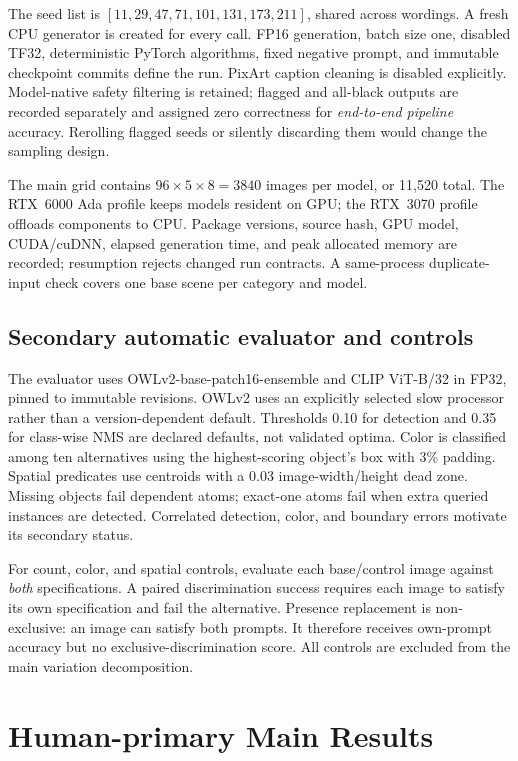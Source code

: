 \documentclass[10pt,letterpaper]{article}
\begin{document}
The seed list is $[11,29,47,71,101,131,173,211]$, shared across wordings. A fresh CPU generator is created for every call. FP16 generation, batch size one, disabled TF32, deterministic PyTorch algorithms, fixed negative prompt, and immutable checkpoint commits define the run. PixArt caption cleaning is disabled explicitly. Model-native safety filtering is retained; flagged and all-black outputs are recorded separately and assigned zero correctness for \emph{end-to-end pipeline} accuracy. Rerolling flagged seeds or silently discarding them would change the sampling design.

The main grid contains $96\times5\times8=3840$ images per model, or 11,520 total. The RTX~6000 Ada profile keeps models resident on GPU; the RTX~3070 profile offloads components to CPU. Package versions, source hash, GPU model, CUDA/cuDNN, elapsed generation time, and peak allocated memory are recorded; resumption rejects changed run contracts. A same-process duplicate-input check covers one base scene per category and model.

\subsection{Secondary automatic evaluator and controls}
The evaluator uses OWLv2-base-patch16-ensemble \cite{owlv2} and CLIP ViT-B/32 \cite{clip} in FP32, pinned to immutable revisions. OWLv2 uses an explicitly selected slow processor rather than a version-dependent default. Thresholds 0.10 for detection and 0.35 for class-wise NMS are declared defaults, not validated optima. Color is classified among ten alternatives using the highest-scoring object's box with 3\% padding. Spatial predicates use centroids with a 0.03 image-width/height dead zone. Missing objects fail dependent atoms; exact-one atoms fail when extra queried instances are detected. Correlated detection, color, and boundary errors motivate its secondary status.

For count, color, and spatial controls, evaluate each base/control image against \emph{both} specifications. A paired discrimination success requires each image to satisfy its own specification and fail the alternative. Presence replacement is non-exclusive: an image can satisfy both prompts. It therefore receives own-prompt accuracy but no exclusive-discrimination score. All controls are excluded from the main variation decomposition.

\section{Human-primary Main Results}
\begin{table}[t]
\centering\small
\caption{Human-primary results on the prespecified 16-scene main audit. Brackets are descriptive 95\% category-stratified scene-bootstrap intervals (2,000 replicates).}
\label{tab:human-primary}

\end{table}
\end{document}
